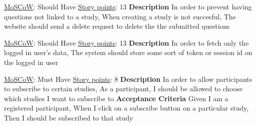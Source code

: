 \documentclass[12pt, a4paper]{report}
\begin{document}
\vspace*{20px}

\begin{tcolorbox}[width=\textwidth,colback={White},title={\textbf {Delete Questions if Study POST fails}},colbacktitle=grey,coltitle=black]

\underline{MoSCoW}: Should Have  
\hfill
\underline {Story points}: 13
\newline
\newline
\blindtext \textbf{Description}\newline
In order to prevent having questions not linked to a study, \newline
When creating a study is not succesful, \newline
The website should send a delete request to delete the the submitted questions
\newline
\end{tcolorbox}  

\vspace*{20px}

\begin{tcolorbox}[width=\textwidth,colback={White},title={\textbf {Login Tokens}},colbacktitle=grey,coltitle=black]

\underline{MoSCoW}: Should Have  
\hfill
\underline {Story points}: 13
\newline
\newline
\blindtext \textbf{Description}\newline
In order to fetch only the logged in user's data,\newline
The system should store some sort of token or session id on the logged in user
\end{tcolorbox}  

\vspace*{20px}

\begin{tcolorbox}[width=\textwidth,colback={White},title={\textbf {Study subscriptions}},colbacktitle=grey,coltitle=black]
\underline{MoSCoW}: Must Have 
\hfill
\underline {Story points}: 8
\newline
\newline
\blindtext \textbf{Description}
\newline
In order to allow participants to subscribe to certain studies, \newline
As a participant, \newline
I should be allowed to choose which studies I want to subscribe to \newline
\newline
 \textbf{Acceptance Criteria}
\newline
Given I am a registered participant, \newline
When I click on a subscribe button on a particular study, \newline
Then I should be subscribed to that study 
\end{tcolorbox} 
\end{document}
